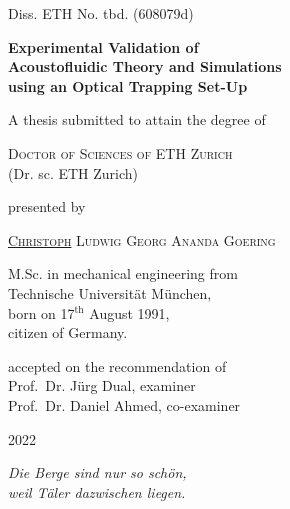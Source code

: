 \begin{titlepage}
  {Diss. ETH No. tbd. (608079d) \vspace{2.5cm}}
\begin{center}
\Large{\textbf{Experimental Validation of\\ Acoustofluidic Theory and 
Simulations\\ using an Optical Trapping Set-Up}}
\end{center}
\vspace{2.0cm}
\begin{center}
{A thesis submitted to attain the degree of}
\end{center}
\begin{center}
{\textsc{Doctor of Sciences of ETH Zurich}}\\
{(Dr. sc. ETH Zurich)}
\end{center}
\vspace{10mm}
\begin{center}
{presented by}
\end{center}
\begin{center}
  {\textsc{\underline{Christoph} Ludwig Georg Ananda Goering}}
\end{center}
\begin{center}
{M.Sc. in mechanical engineering from\\
Technische Universit\"at M\"unchen,\\
born on 17$^{\text{th}}$ August 1991,\\
citizen of Germany.}
\end{center}
\vspace{10mm}
\begin{center}
{accepted on the recommendation of \\ \vspace{0.3cm}
Prof.\ Dr. J\"urg Dual, examiner \\
Prof.\ Dr. Daniel Ahmed, co-examiner}
\end{center}
\vspace{5mm}
\begin{center}
2022
\end{center}

\cleardoublepage
\thispagestyle{empty}
\vspace*{5.0cm}

\begin{flushright}
\vspace*{0.5cm}
\large
\textit{Die Berge sind nur so schön,\\ weil Täler dazwischen liegen.}

\end{flushright}

\clearpage
\cleardoublepage
\end{titlepage}
